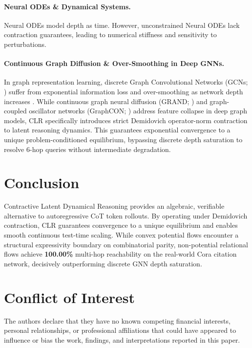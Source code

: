 \documentclass[11pt,a4paper]{article}
\begin{document}
\paragraph{Neural ODEs \& Dynamical Systems.} Neural ODEs \citep{chen2018neural} model depth as time. However, unconstrained Neural ODEs lack contraction guarantees, leading to numerical stiffness and sensitivity to perturbations.

\paragraph{Continuous Graph Diffusion \& Over-Smoothing in Deep GNNs.} In graph representation learning, discrete Graph Convolutional Networks (GCNs; \citealp{kipf2017semi}) suffer from exponential information loss and over-smoothing as network depth increases \citep{li2018deeper}. While continuous graph neural diffusion (GRAND; \citealp{chamberlain2021grand}) and graph-coupled oscillator networks (GraphCON; \citealp{rusch2022graph}) address feature collapse in deep graph models, CLR specifically introduces strict Demidovich operator-norm contraction to latent reasoning dynamics. This guarantees exponential convergence to a unique problem-conditioned equilibrium, bypassing discrete depth saturation to resolve 6-hop queries without intermediate degradation.

\section{Conclusion}

Contractive Latent Dynamical Reasoning provides an algebraic, verifiable alternative to autoregressive CoT token rollouts. By operating under Demidovich contraction, CLR guarantees convergence to a unique equilibrium and enables smooth continuous test-time scaling. While convex potential flows encounter a structural expressivity boundary on combinatorial parity, non-potential relational flows achieve \textbf{100.00\%} multi-hop reachability on the real-world Cora citation network, decisively outperforming discrete GNN depth saturation.

\section*{Conflict of Interest}
The authors declare that they have no known competing financial interests, personal relationships, or professional affiliations that could have appeared to influence or bias the work, findings, and interpretations reported in this paper.
\end{document}
